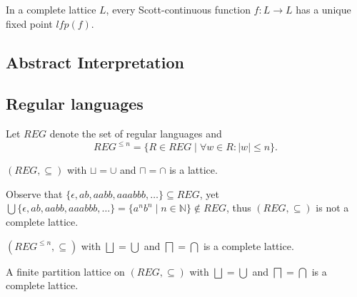 \begin{theorem}
    In a complete lattice $L$, every Scott-continuous function $f : L \rightarrow L$ has a unique fixed point $lfp(f)$.
\end{theorem}


\subsection{Abstract Interpretation}

\subsection{Regular languages}

Let $REG$ denote the set of regular languages and 
\begin{equation*}
    REG^{\leq n} = \{R \in REG \mid \forall w \in R : |w| \leq n\}.
\end{equation*}

\begin{theorem}
    $(REG, \subseteq)$ with $\sqcup = \cup$ and $\sqcap = \cap$ is a lattice.
\end{theorem}

Observe that $\{ \epsilon, ab, aabb, aaabbb, \dots \} \subseteq REG$, yet $\bigcup\{ \epsilon, ab, aabb, aaabbb, \dots \} = \{a^nb^n \mid n \in \mathbb{N}\} \notin REG$, thus $(REG, \subseteq)$ is not a complete lattice.

\begin{theorem}
    $(REG^{\leq n}, \subseteq)$ with $\bigsqcup = \bigcup$ and $\bigsqcap = \bigcap$ is a complete lattice.
\end{theorem}

\begin{theorem}
    A finite partition lattice on $(REG, \subseteq)$ with $\bigsqcup = \bigcup$ and $\bigsqcap = \bigcap$ is a complete lattice.
\end{theorem}


